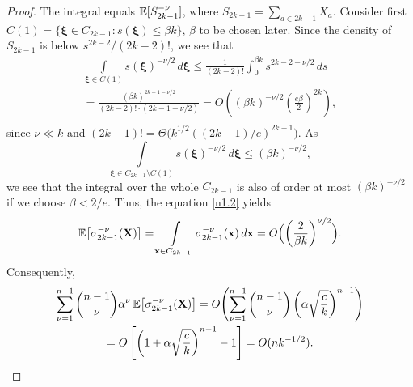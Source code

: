 \documentclass[11pt]{amsart}
\def\a{\alpha}
\def\be{\beta}
\theoremstyle{remark}
\numberwithin{equation}{section}
\begin{document}
\begin{proof}
The integral equals $\Bbb E[S_{2k-1}^{-\nu}]$, where $S_{2k-1}=\sum_{a\in 2k-1}X_a$. Consider first 
$C(1)=\{\boldsymbol\xi\in C_{2k-1}: s(\boldsymbol\xi)\le \be k\}$, $\be$ to be chosen later. Since the density of 
$S_{2k-1}$ is below $s^{2k-2}/(2k-2)!$, we see that
\begin{multline*}
\int\limits_{\boldsymbol\xi\in C(1)}\!\!\!\!s(\boldsymbol\xi)^{-\nu/2}\,d\boldsymbol\xi
\le\frac{1}{(2k-2)!}\int_0^{\be k} s^{2k-2-\nu/2}\,ds\\
=\frac{(\be k)^{2k-1-\nu/2}}{(2k-2)!\cdot(2k-1-\nu/2)}=O\left((\be k)^{-\nu/2}\left(\frac{e\be}{2}\right)^{2k}
\right),\\
\end{multline*}
since $\nu\ll k$ and $(2k-1)!=\Theta\bigl(k^{1/2}((2k-1)/e)^{2k-1}\bigr)$. As
\[
\int\limits_{\boldsymbol\xi\in C_{2k-1}\setminus C(1)}\!\!\!\!s(\boldsymbol\xi)^{-\nu/2}\,d\boldsymbol\xi
\le  (\be k)^{-\nu/2},
\]
we see that the integral over the whole $C_{2k-1}$ is also of order at most $(\be k)^{-\nu/2}$ if we choose $\be<2/e$.
Thus, the equation \eqref{n1.2} yields 
\begin{equation}\label{n1.31}
\Bbb E \bigl[\sigma_{2k-1}^{-\nu}(\bold X)\bigr]=\int\limits_{\bold x\in C_{2k-1}}\sigma^{-\nu}_{2k-1}(\bold x)\,d\bold x=O\Bigl(\left(\frac{2}{\be k}\right)^{\nu/2}\Bigr).
\end{equation}
Consequently,
\begin{multline*}
\sum_{\nu=1}^{n-1}\binom{n-1}{\nu}\a^{\nu}\,\Bbb E\bigl[\sigma^{-\nu}_{2k-1}(\bold X)\bigr]
=O\!\left(\sum_{\nu=1}^{n-1}\binom{n-1}{\nu}\left(\a\sqrt{\frac{c}{k}}\right)^{n-1}\right)\\
=O\left[\left(1+\a\sqrt{\frac{c}{k}}\right)^{n-1} - 1\right]=O(nk^{-1/2}).
\end{multline*}
\end{proof}
\end{document}
